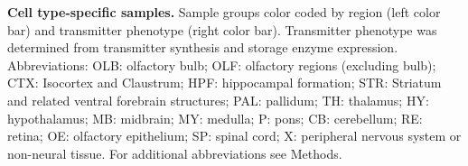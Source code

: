 \textbf{Cell type-specific samples.} Sample groups color coded by region (left color bar) and transmitter phenotype (right color bar). Transmitter phenotype was determined from transmitter synthesis and storage enzyme expression. Abbreviations: OLB: olfactory bulb; OLF: olfactory regions (excluding bulb); CTX: Isocortex and Claustrum; HPF: hippocampal formation; STR: Striatum and related ventral forebrain structures; PAL: pallidum; TH: thalamus; HY: hypothalamus; MB: midbrain; MY: medulla; P: pons; CB: cerebellum; RE: retina; OE: olfactory epithelium; SP: spinal cord; X: peripheral nervous system or non-neural tissue. For additional abbreviations see Methods.
